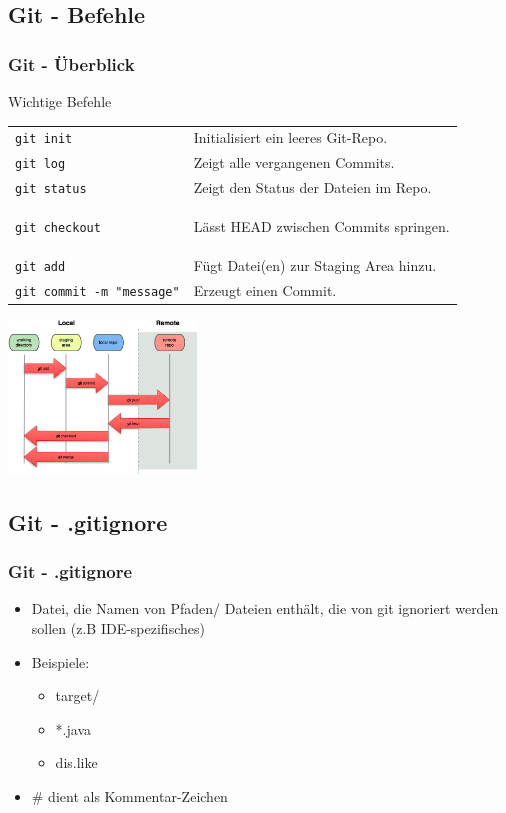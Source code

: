 \documentclass[18pt]{beamer}
\begin{document}
	\subsection{Git - Befehle}
	\begin{frame}
		\frametitle{Git - Überblick}
		\begin{block}{Wichtige Befehle}
			\begin{tabular}{ll}
				\texttt{git init} &  Initialisiert ein leeres Git-Repo.\\
				\texttt{git log} &  Zeigt alle vergangenen Commits.\\
				\texttt{git status} &  Zeigt den Status der Dateien im Repo.\\
				\texttt{git checkout} & \begin{small}
					Lässt HEAD zwischen Commits springen. 
				\end{small}\\
				\texttt{git add} &  Fügt Datei(en) zur Staging Area hinzu.\\
				\texttt{git commit -m "message"} &  Erzeugt einen Commit.\\ 
			\end{tabular}
		\end{block}
		\centering \includegraphics[width=50mm, scale=1.3]{./pics/tut0/git-file-lifecycle.png}
	\end{frame}

	\subsection{Git - .gitignore}
	\begin{frame}
		\frametitle{Git - .gitignore}
		\begin{itemize}
			\item Datei, die Namen von Pfaden/ Dateien enthält, die von git ignoriert werden sollen (z.B IDE-spezifisches)
			\item Beispiele: 
			\begin{itemize}
				\item target/
				\item *.java
				\item dis.like
			\end{itemize}
			\item \# dient als Kommentar-Zeichen
		\end{itemize}
	\end{frame}
	
\end{document}
